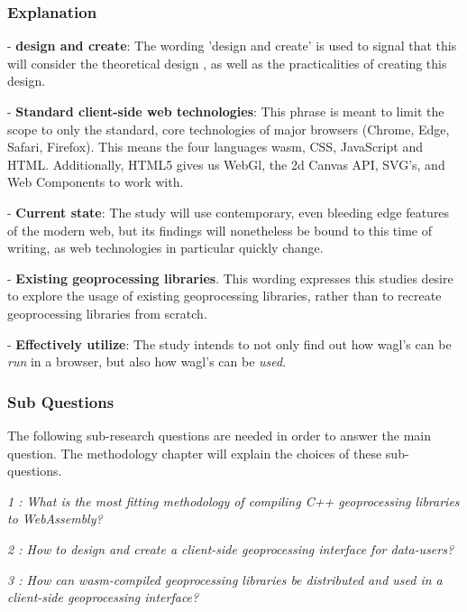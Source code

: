 \subsubsection*{Explanation}


- \textbf{design and create}: The wording 'design and create' is used to signal that this will consider the theoretical design , as well as the practicalities of creating this design. 

- \textbf{Standard client-side web technologies}: This phrase is meant to limit the scope to only the standard, core technologies of major browsers (Chrome, Edge, Safari, Firefox). This means the four languages \ac{wasm}, CSS, JavaScript and HTML. Additionally, HTML5 gives us WebGl, the 2d Canvas API, SVG's, and Web Components to work with.

- \textbf{Current state}: The study will use contemporary, even bleeding edge features of the modern web, but its findings will nonetheless be bound to this time of writing, as web technologies in particular quickly change. 

- \textbf{Existing geoprocessing libraries}. This wording expresses this studies desire to explore the usage of existing geoprocessing libraries, rather than to recreate geoprocessing libraries from scratch.

- \textbf{Effectively utilize}: The study intends to not only find out how \ac{wagl}'s can be \textit{run} in a browser, but also how \ac{wagl}'s can be \textit{used}. 


\subsubsection*{Sub Questions}

The following sub-research questions are needed in order to answer the main question. The methodology chapter will explain the choices of these sub-questions. 

\textit{1 : What is the most fitting methodology of compiling C++ geoprocessing libraries to WebAssembly?}

\textit{2 : How to design and create a client-side geoprocessing interface for data-users?}

\textit{3 : How can wasm-compiled geoprocessing libraries be distributed and used in a client-side geoprocessing interface?}


